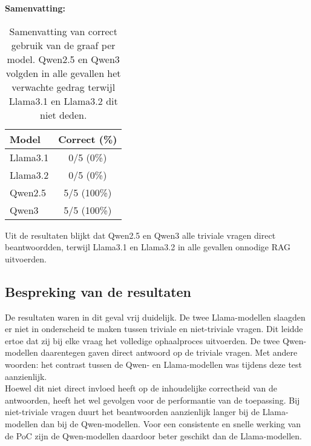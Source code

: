 \noindent\textbf{Samenvatting:}  
\begin{table}[H]
    \begin{tabular}{|l|c|}
        \hline
        \textbf{Model} & \textbf{Correct (\%)} \\
        \hline
        Llama3.1 & 0/5 (0\%) \\
        Llama3.2 & 0/5 (0\%) \\
        Qwen2.5  & 5/5 (100\%) \\
        Qwen3    & 5/5 (100\%) \\
        \hline
    \end{tabular}
    \caption{Samenvatting van correct gebruik van de graaf per model. Qwen2.5 en Qwen3 volgden in alle gevallen het verwachte gedrag terwijl Llama3.1 en Llama3.2 dit niet deden.}
\end{table}

Uit de resultaten blijkt dat Qwen2.5 en Qwen3 alle triviale vragen direct beantwoordden, terwijl Llama3.1 en Llama3.2 in alle gevallen onnodige RAG uitvoerden.

\subsection{Bespreking van de resultaten}
De resultaten waren in dit geval vrij duidelijk. De twee Llama-modellen slaagden er niet in onderscheid te maken tussen triviale en niet-triviale vragen. Dit leidde ertoe dat zij bij elke vraag het volledige ophaalproces uitvoerden. De twee Qwen-modellen daarentegen gaven direct antwoord op de triviale vragen. Met andere woorden: het contrast tussen de Qwen- en Llama-modellen was tijdens deze test aanzienlijk.
\\[1em]
Hoewel dit niet direct invloed heeft op de inhoudelijke correctheid van de antwoorden, heeft het wel gevolgen voor de performantie van de toepassing. Bij niet-triviale vragen duurt het beantwoorden aanzienlijk langer bij de Llama-modellen dan bij de Qwen-modellen. Voor een consistente en snelle werking van de PoC zijn de Qwen-modellen daardoor beter geschikt dan de Llama-modellen.


